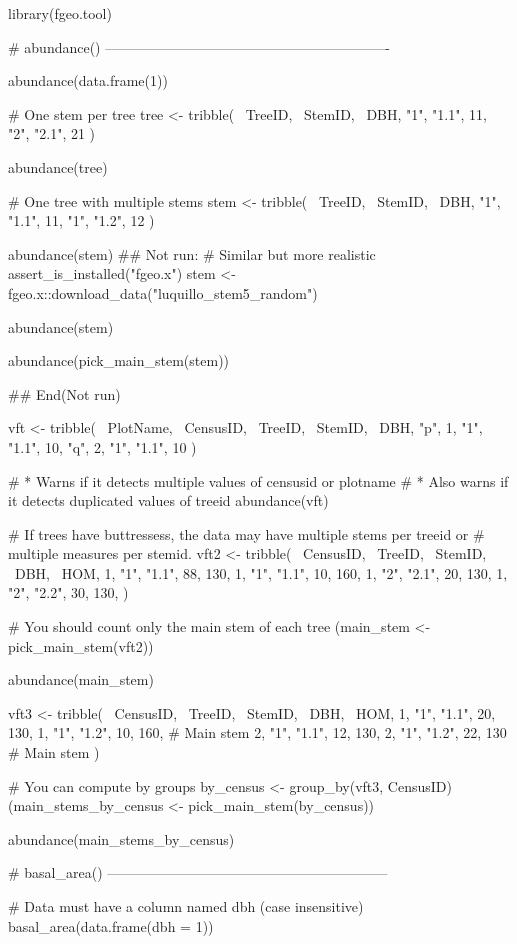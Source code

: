 \documentclass[a4paper]{book}
\begin{document}
%
\begin{Examples}
\begin{ExampleCode}
library(fgeo.tool)

# abundance() -------------------------------------------------------------

abundance(data.frame(1))

# One stem per tree
tree <- tribble(
  ~TreeID, ~StemID, ~DBH,
  "1", "1.1", 11,
  "2", "2.1", 21
)

abundance(tree)

# One tree with multiple stems
stem <- tribble(
  ~TreeID, ~StemID, ~DBH,
  "1", "1.1", 11,
  "1", "1.2", 12
)

abundance(stem)
## Not run: 
# Similar but more realistic
assert_is_installed("fgeo.x")
stem <- fgeo.x::download_data("luquillo_stem5_random")

abundance(stem)

abundance(pick_main_stem(stem))

## End(Not run)

vft <- tribble(
  ~PlotName, ~CensusID, ~TreeID, ~StemID, ~DBH,
  "p", 1, "1", "1.1", 10,
  "q", 2, "1", "1.1", 10
)

# * Warns if it detects multiple values of censusid or plotname
# * Also warns if it detects duplicated values of treeid
abundance(vft)

# If trees have buttressess, the data may have multiple stems per treeid or
# multiple measures per stemid.
vft2 <- tribble(
  ~CensusID, ~TreeID, ~StemID, ~DBH, ~HOM,
  1, "1", "1.1", 88, 130,
  1, "1", "1.1", 10, 160,
  1, "2", "2.1", 20, 130,
  1, "2", "2.2", 30, 130,
)

# You should count only the main stem of each tree
(main_stem <- pick_main_stem(vft2))

abundance(main_stem)

vft3 <- tribble(
  ~CensusID, ~TreeID, ~StemID, ~DBH, ~HOM,
  1, "1", "1.1", 20, 130,
  1, "1", "1.2", 10, 160, # Main stem
  2, "1", "1.1", 12, 130,
  2, "1", "1.2", 22, 130 # Main stem
)

# You can compute by groups
by_census <- group_by(vft3, CensusID)
(main_stems_by_census <- pick_main_stem(by_census))

abundance(main_stems_by_census)

# basal_area() ------------------------------------------------------------

# Data must have a column named dbh (case insensitive)
basal_area(data.frame(dbh = 1))


\end{ExampleCode}
\end{Examples}
\end{document}
